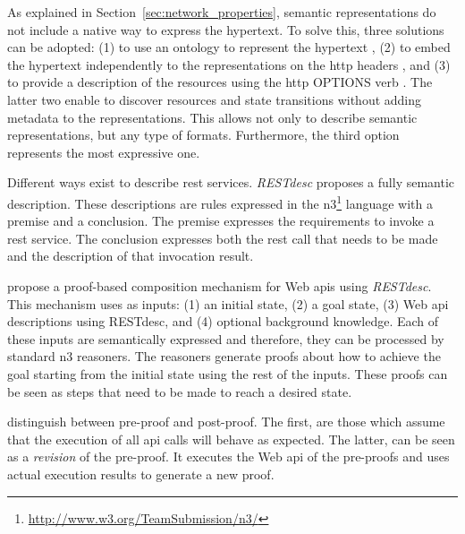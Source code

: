 As explained in Section~\ref{sec:network_properties}, semantic representations do not include a native way to express the hypertext. %
To solve this, three solutions can be adopted:
(1) to use an ontology to represent the hypertext \citep{kjernsmo_necessity_2012},
(2) to embed the hypertext independently to the representations on the \ac{http} headers \citep{erik_profile_2013}, and
(3) to provide a description of the resources using the \ac{http} OPTIONS verb \citep{verborgh_functional_2012,verborgh_ijcs_2014}.
The latter two enable to discover resources and state transitions without adding metadata to the representations.
This allows not only to describe semantic representations, but any type of formats.
Furthermore, the third option represents the most expressive one. %


Different ways exist to describe \ac{rest} services. %
\emph{RESTdesc} \citep{verborgh_functional_2012} proposes a fully semantic description.
These descriptions are rules expressed in the \ac{n3}\footnote{\url{http://www.w3.org/TeamSubmission/n3/}} language with a premise and a conclusion.
The premise expresses the requirements to invoke a \ac{rest} service.
The conclusion expresses both the \ac{rest} call that needs to be made and the description of that invocation result.


\citet{verborgh_ijcs_2014} propose a proof-based composition mechanism for Web \acp{api} using \emph{RESTdesc}.
This mechanism uses as inputs:
(1) an initial state,
(2) a goal state,
(3) Web \ac{api} descriptions using RESTdesc, and
(4) optional background knowledge.
Each of these inputs are semantically expressed and therefore, they can be processed by standard \ac{n3} reasoners.
The reasoners generate proofs about how to achieve the goal starting from the initial state using the rest of the inputs.
These proofs can be seen as steps that need to be made to reach a desired state.


\citeauthor{verborgh_ijcs_2014} distinguish between pre-proof and post-proof.
The first, are those which assume that the execution of all \acs{api} calls will behave as expected.
The latter, can be seen as a \emph{revision} of the pre-proof.
It executes the Web \acs{api} of the pre-proofs and uses actual execution results to generate a new proof.



